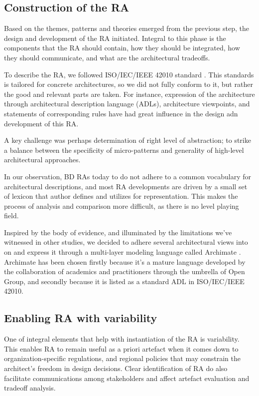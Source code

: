 \documentclass[runningheads]{llncs}
\begin{document}
\subsection{Construction of the RA}

Based on the themes, patterns and theories emerged from the previous step, the design and development of the RA initiated. Integral to this phase is the components that the RA should contain, how they should be integrated, how they should communicate, and what are the architectural tradeoffs. 

To describe the RA, we followed ISO/IEC/IEEE 42010 standard \cite{ISO42010}. This standards is tailored for concrete architectures, so we did not fully conform to it, but rather the good and relevant parts are taken. For instance, expression of the architecture through architectural description language (ADLs), architecture viewpoints, and statements of corresponding rules have had great influence in the design adn development of this RA. 

A key challenge was perhaps determination of right level of abstraction; to strike a balance between the specificity of micro-patterns and generality of high-level architectural approaches. 

In our observation, BD RAs today to do not adhere to a common vocabulary for architectural descriptions, and most RA developments are driven by a small set of lexicon that author defines and utilizes for representation. This makes the process of analysis and comparison more difficult, as there is no level playing field. 

Inspired by the body of evidence, and illuminated by the limitations we've witnessed in other studies, we decided to adhere several architectural views into on and express it through a multi-layer modeling language called Archimate \cite{lankhorst2010anatomy}. Archimate has been chosen firstly because it's a mature language developed by the collaboration of academics and practitioners through the umbrella of Open Group, and secondly because it is listed as a standard ADL in ISO/IEC/IEEE 42010. 

\subsection{Enabling RA with variability}

One of integral elements that help with instantiation of the RA is variability. This enables RA to remain useful as a priori artefact when it comes down to organization-specific regulations, and regional policies that may constrain the architect's freedom in design decisions. Clear identification of RA do also facilitate communications among stakeholders and affect artefact evaluation and tradeoff analysis. 
\end{document}
